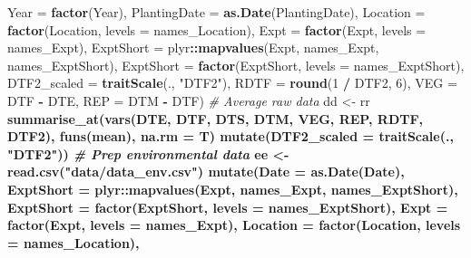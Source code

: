 \documentclass[
]{article}
\newenvironment{Shaded}{\begin{snugshade}}{\end{snugshade}}
\newcommand{\CommentTok}[1]{\textcolor[rgb]{0.56,0.35,0.01}{\textit{#1}}}
\newcommand{\DataTypeTok}[1]{\textcolor[rgb]{0.13,0.29,0.53}{#1}}
\newcommand{\DecValTok}[1]{\textcolor[rgb]{0.00,0.00,0.81}{#1}}
\newcommand{\KeywordTok}[1]{\textcolor[rgb]{0.13,0.29,0.53}{\textbf{#1}}}
\newcommand{\NormalTok}[1]{#1}
\newcommand{\OperatorTok}[1]{\textcolor[rgb]{0.81,0.36,0.00}{\textbf{#1}}}
\newcommand{\StringTok}[1]{\textcolor[rgb]{0.31,0.60,0.02}{#1}}
\begin{document}
\begin{Shaded}
\begin{Highlighting}[]
{{{{{         \DataTypeTok{Year         =} \KeywordTok{factor}\NormalTok{(Year), }
         \DataTypeTok{PlantingDate =} \KeywordTok{as.Date}\NormalTok{(PlantingDate),}
         \DataTypeTok{Location     =} \KeywordTok{factor}\NormalTok{(Location, }\DataTypeTok{levels =}\NormalTok{ names_Location),}
         \DataTypeTok{Expt         =} \KeywordTok{factor}\NormalTok{(Expt,     }\DataTypeTok{levels =}\NormalTok{ names_Expt),}
         \DataTypeTok{ExptShort    =}\NormalTok{ plyr}\OperatorTok{::}\KeywordTok{mapvalues}\NormalTok{(Expt, names_Expt, names_ExptShort),}
         \DataTypeTok{ExptShort    =} \KeywordTok{factor}\NormalTok{(ExptShort, }\DataTypeTok{levels =}\NormalTok{ names_ExptShort),}
         \DataTypeTok{DTF2_scaled =} \KeywordTok{traitScale}\NormalTok{(., }\StringTok{"DTF2"}\NormalTok{),}
         \DataTypeTok{RDTF         =} \KeywordTok{round}\NormalTok{(}\DecValTok{1} \OperatorTok{/}\StringTok{ }\NormalTok{DTF2, }\DecValTok{6}\NormalTok{),}
         \DataTypeTok{VEG          =}\NormalTok{ DTF }\OperatorTok{-}\StringTok{ }\NormalTok{DTE,}
         \DataTypeTok{REP          =}\NormalTok{ DTM }\OperatorTok{-}\StringTok{ }\NormalTok{DTF)}
\CommentTok{# Average raw data}
\NormalTok{dd <-}\StringTok{ }\NormalTok{rr }\OperatorTok{%
\StringTok{  }\KeywordTok{summarise_at}\NormalTok{(}\KeywordTok{vars}\NormalTok{(DTE, DTF, DTS, DTM, VEG, REP, RDTF, DTF2),}
               \KeywordTok{funs}\NormalTok{(mean), }\DataTypeTok{na.rm =}\NormalTok{ T) }\OperatorTok{%
\StringTok{  }\KeywordTok{mutate}\NormalTok{(}\DataTypeTok{DTF2_scaled =} \KeywordTok{traitScale}\NormalTok{(., }\StringTok{"DTF2"}\NormalTok{))}
\CommentTok{# Prep environmental data}
\NormalTok{ee <-}\StringTok{ }\KeywordTok{read.csv}\NormalTok{(}\StringTok{"data/data_env.csv"}\NormalTok{) }\OperatorTok{%
\StringTok{  }\KeywordTok{mutate}\NormalTok{(}\DataTypeTok{Date      =} \KeywordTok{as.Date}\NormalTok{(Date),}
         \DataTypeTok{ExptShort =}\NormalTok{ plyr}\OperatorTok{::}\KeywordTok{mapvalues}\NormalTok{(Expt, names_Expt, names_ExptShort),}
         \DataTypeTok{ExptShort =} \KeywordTok{factor}\NormalTok{(ExptShort, }\DataTypeTok{levels =}\NormalTok{ names_ExptShort),}
         \DataTypeTok{Expt      =} \KeywordTok{factor}\NormalTok{(Expt,      }\DataTypeTok{levels =}\NormalTok{ names_Expt),}
         \DataTypeTok{Location  =} \KeywordTok{factor}\NormalTok{(Location,  }\DataTypeTok{levels =}\NormalTok{ names_Location),}
}}}}}}}}
\end{Highlighting}
\end{Shaded}
\end{document}

